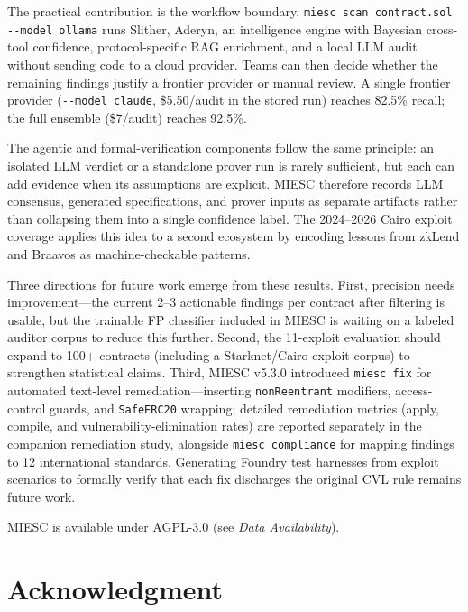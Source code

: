 \documentclass[conference]{IEEEtran}
\begin{document}
The practical contribution is the workflow boundary. \texttt{miesc scan contract.sol -{}-model ollama} runs Slither, Aderyn, an intelligence engine with Bayesian cross-tool confidence, protocol-specific RAG enrichment, and a local LLM audit without sending code to a cloud provider. Teams can then decide whether the remaining findings justify a frontier provider or manual review. A single frontier provider (\texttt{-{}-model claude}, \$5.50/audit in the stored run) reaches 82.5\% recall; the full ensemble (\$7/audit) reaches 92.5\%.

The agentic and formal-verification components follow the same principle: an isolated LLM verdict or a standalone prover run is rarely sufficient, but each can add evidence when its assumptions are explicit. MIESC therefore records LLM consensus, generated specifications, and prover inputs as separate artifacts rather than collapsing them into a single confidence label. The 2024--2026 Cairo exploit coverage applies this idea to a second ecosystem by encoding lessons from zkLend and Braavos as machine-checkable patterns.

Three directions for future work emerge from these results. First, precision needs improvement---the current 2--3 actionable findings per contract after filtering is usable, but the trainable FP classifier included in MIESC is waiting on a labeled auditor corpus to reduce this further. Second, the 11-exploit evaluation should expand to 100+ contracts (including a Starknet/Cairo exploit corpus) to strengthen statistical claims. Third, MIESC v5.3.0 introduced \texttt{miesc fix} for automated text-level remediation---inserting \texttt{nonReentrant} modifiers, access-control guards, and \texttt{SafeERC20} wrapping; detailed remediation metrics (apply, compile, and vulnerability-elimination rates) are reported separately in the companion remediation study, alongside \texttt{miesc compliance} for mapping findings to 12 international standards. Generating Foundry test harnesses from exploit scenarios to formally verify that each fix discharges the original CVL rule remains future work.

MIESC is available under AGPL-3.0 (see \emph{Data Availability}).

\section*{Acknowledgment}
\end{document}
